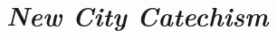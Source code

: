 \documentclass[twoside,12pt]{memoir}
\begin{document}
\frontmatter



\pagestyle{myPageStyle}

\mainmatter



\chapter{\em New City Catechism}











\pagestyle{empty}


\end{document}
